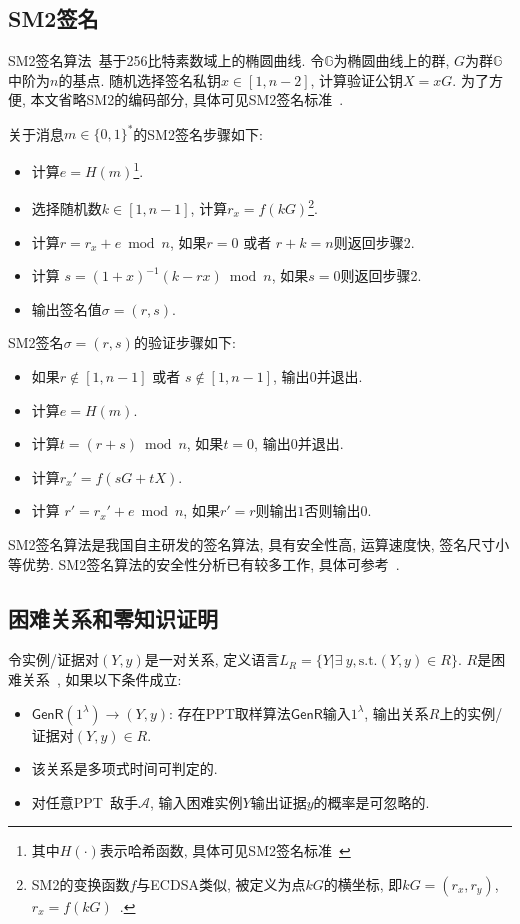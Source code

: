 \documentclass[review]{jcr}
\begin{document}
\subsection{SM2签名}
SM2签名算法~\cite{SM2,SM2-survey,ZhangYZC15}基于256比特素数域上的椭圆曲线. 
令$\mathbb{G}$为椭圆曲线上的群, $G$为群$\mathbb{G}$中阶为$n$的基点. 随机选择签名私钥$x\in [1,n-2]$, 计算验证公钥$X=xG$. 为了方便, 本文省略SM2的编码部分, 具体可见SM2签名标准~\cite{SM2}. 

关于消息$m \in \{0, 1\}^*$的SM2签名步骤如下: 

\begin{itemize}
\item[1.] 计算$e = H(m)$\footnote{其中$H(\cdot)$表示哈希函数, 具体可见SM2签名标准~\cite{SM2}}. 
\item[2.] 选择随机数$k\in [1,n-1]$, 计算$r_x=f(kG)$\footnote{SM2的变换函数$f$与ECDSA类似, 被定义为点$kG$的横坐标, 即$kG=(r_x,r_y)$, $r_x=f(kG)$~\cite{ZhangYZC15,AumayrEEFHMMR20}.}. 
\item[3.] 计算$r = r_x + e \bmod n$, 如果$r = 0$ 或者 $r + k = n$则返回步骤2. 
\item[4.] 计算 $s=(1+x)^{-1}(k-rx) \bmod n$, 如果$s=0$则返回步骤2. 
\item[5.] 输出签名值$\sigma = (r, s)$. 
\end{itemize}

SM2签名$\sigma = (r, s)$的验证步骤如下:  
\begin{itemize}
\item[1.] 如果$r\notin [1,n − 1]$ 或者 $s\notin [1,n − 1]$, 输出$0$并退出.
\item[2.] 计算$e = H(m)$. 
\item[3.] 计算$t=(r+s) \bmod n$, 如果$t=0$, 输出$0$并退出. 
\item[4.] 计算$r_x'=f(sG+tX)$. 
\item[5.] 计算 $r'=r_x'+e \bmod n$, 如果$r'=r$则输出$1$否则输出$0$. 
\end{itemize}

SM2签名算法是我国自主研发的签名算法, 具有安全性高, 运算速度快, 签名尺寸小等优势. SM2签名算法的安全性分析已有较多工作, 具体可参考~\cite{ZhangYZC15,SM2-survey,SM2}.

\subsection{困难关系和零知识证明}

令实例/证据对$(Y,y)$是一对关系, 定义语言$L_R=\{Y|\exists\ y, \text{s.t.} (Y,y)\in R\}$. $R$是困难关系~\cite{AumayrEEFHMMR20}, 如果以下条件成立: 
\begin{itemize}
  \item $\mathsf{GenR}(1^\lambda)\rightarrow (Y,y)$: 存在PPT取样算法$\mathsf{GenR}$输入$1^\lambda$, 输出关系$R$上的实例/证据对$(Y,y)\in R$.

  \item 该关系是多项式时间可判定的. 

  \item 对任意PPT\ 敌手$\mathcal{A}$, 输入困难实例$Y$输出证据$y$的概率是可忽略的.
\end{itemize}
\end{document}
